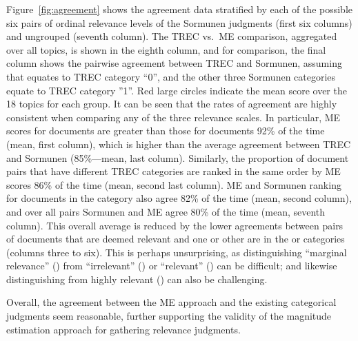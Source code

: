 % 


Figure~\ref{fig:agreement} shows the agreement data stratified by each of the possible six pairs of
ordinal relevance levels of the Sormunen judgments (first six columns)
and ungrouped (seventh column).
The TREC vs.\ ME comparison, aggregated over all topics, is shown in the
eighth column, and for comparison, the final column shows the pairwise
agreement between TREC and Sormunen, assuming that 
\nn equates  to TREC category ``0'', and the other three Sormunen categories 
equate to TREC category ''1''.
Red large circles indicate the mean score over the 18 topics for each group.
It can be seen that the rates of agreement are highly consistent when
comparing any of the three relevance scales.
In particular, ME scores for \hh documents are greater than those for 
\nn documents 92\% of the time (mean, first column), which is
higher than the average agreement between TREC and Sormunen
(85\%---mean, last column).
Similarly, the proportion of document pairs that have different TREC
categories are ranked in the same order by ME scores 86\% of the time
(mean, second last column).
ME  and Sormunen ranking for documents in the \nn\rr category
also agree 82\% of the time (mean, second column), and over all pairs
Sormunen and ME agree 80\% of the time (mean, seventh column).
This overall average is reduced by the lower agreements between pairs
of documents that are deemed relevant and one or other are in the 
\mm or \rr categories (columns three to six).
This is perhaps unsurprising, as distinguishing ``marginal relevance'' (\mm)
from ``irrelevant'' (\nn) or ``relevant'' (\rr) can be difficult; and likewise 
distinguishing \rr from highly relevant (\hh) can also be challenging.

Overall, the agreement between the ME approach and the existing 
categorical judgments seem reasonable, 
further supporting the validity of the magnitude estimation
approach for gathering relevance judgments.


